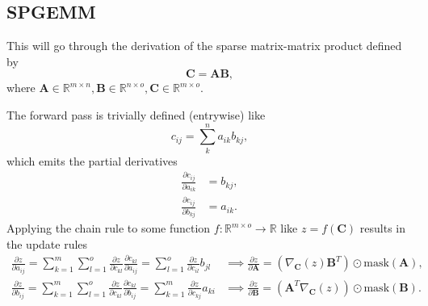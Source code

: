 \documentclass{article}
\newcommand{\mat}[1]{\bm{{#1}}}
\newcommand{\mask}[1]{\text{mask}\left( {#1} \right)}
\newcommand{\gradfn}[2]{\nabla_{{#1}}\left({#2}\right)} %
\theoremstyle{definition}
\begin{document}
\subsection{SPGEMM}
This will go through the derivation of the sparse matrix-matrix product defined by
\begin{equation}
  \mat{C} = \mat{A}\mat{B},
\end{equation}
where $\mat{A} \in \mathbb{R}^{m \times n}, \mat{B} \in \mathbb{R}^{n \times o}, \mat{C} \in \mathbb{R}^{m \times o}$.

The forward pass is trivially defined (entrywise) like
\begin{equation}
  c_{ij} = \sum_k^n a_{ik} b_{kj},
\end{equation}
which emits the partial derivatives
\begin{align}
  \frac{\partial c_{ij}}{\partial a_{ik}} &= b_{kj}, \\
  \frac{\partial c_{ij}}{\partial b_{kj}} &= a_{ik}.
\end{align}
Applying the chain rule to some function $f : \mathbb{R}^{m \times o} \to \mathbb{R}$ like $z=f\left(\mat{C}\right)$ results in the update rules
\begin{align}
  \frac{\partial z}{\partial a_{ij}} = \sum_{k=1}^m \sum_{l=1}^o \frac{\partial z}{\partial c_{kl}} \frac{\partial c_{kl}}{\partial a_{ij}} = \sum_{l=1}^o \frac{\partial z}{\partial c_{il}} b_{jl} &\implies \frac{\partial z}{\partial \mat{A}} = \left(\gradfn{\mat{C}}{z} \mat{B}^T\right) \odot \mask{\mat{A}}, \\
  \frac{\partial z}{\partial b_{ij}} = \sum_{k=1}^m \sum_{l=1}^o \frac{\partial z}{\partial c_{kl}} \frac{\partial c_{kl}}{\partial b_{ij}} = \sum_{k=1}^m \frac{\partial z}{\partial c_{kj}} a_{ki} &\implies \frac{\partial z}{\partial \mat{B}} = \left(\mat{A}^T \gradfn{\mat{C}}{z}\right) \odot \mask{\mat{B}}.
\end{align}
\end{document}
